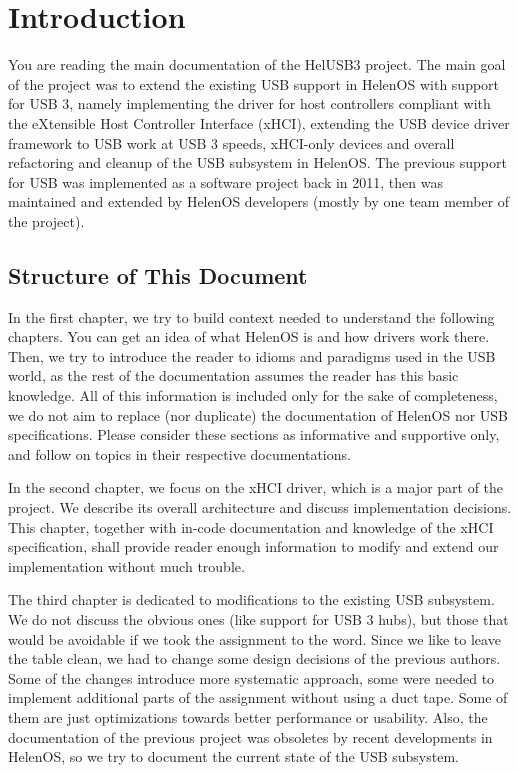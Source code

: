 \chapter{Introduction}

You are reading the main documentation of the HelUSB3 project. The main goal of
the project was to extend the existing USB support in HelenOS with support for
USB 3, namely implementing the driver for host controllers compliant with the
eXtensible Host Controller Interface (xHCI), extending the USB device driver
framework to USB work at USB 3 speeds, xHCI-only devices and overall refactoring and cleanup of
the USB subsystem in HelenOS. The previous support for USB was implemented as
a software project back in 2011, then was maintained and extended by HelenOS
developers (mostly by one team member of the project).

\section{Structure of This Document}

In the first chapter, we try to build context needed to understand the
following chapters. You can get an idea of what HelenOS is and how drivers work
there. Then, we try to introduce the reader to idioms and paradigms used in the
USB world, as the rest of the documentation assumes the reader has this basic
knowledge. All of this information is included only for the sake of
completeness, we do not aim to replace (nor duplicate) the documentation of
HelenOS nor USB specifications. Please consider these sections as informative
and supportive only, and follow on topics in their respective documentations.

In the second chapter, we focus on the xHCI driver, which is a major part of
the project. We describe its overall architecture and discuss implementation
decisions. This chapter, together with in-code documentation and knowledge of the
xHCI specification, shall provide reader enough information to modify and
extend our implementation without much trouble.

The third chapter is dedicated to modifications to the existing USB subsystem.
We do not discuss the obvious ones (like support for USB 3 hubs), but those
that would be avoidable if we took the assignment to the word. Since we like to
leave the table clean, we had to change some design decisions of the previous
authors. Some of the changes introduce more systematic approach, some were
needed to implement additional parts of the assignment without using a duct
tape. Some of them are just optimizations towards better performance or
usability. Also, the documentation of the previous project was obsoletes by
recent developments in HelenOS, so we try to document the current state of
the USB subsystem.

